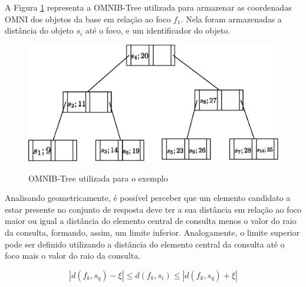 A Figura \ref{fig:btree} representa a OMNIB-Tree utilizada para armazenar as coordenadas OMNI dos objetos da base em relação ao foco $f_1$. Nela foram armazenadas
a distância do objeto $s_i$ até o foco, e um identificador do objeto.

\begin{figure}[H]
\centering
\caption{OMNIB-Tree utilizada para o exemplo}
\includegraphics[width=.8\textwidth]{dados/figuras/btree.eps}
\label{fig:btree}
\end{figure}

Analisando geometricamente, é possível perceber que um elemento candidato a estar presente no conjunto de resposta deve ter a sua distância em relação ao foco maior ou igual a distância do elemento central de consulta menos o valor do
raio da consulta, formando, assim, um limite inferior. Analogamente, o limite superior pode ser definido utilizando a distância do elemento central da consulta até o foco mais o valor do raio da consulta.

\begin{equation} \label{eq:omnirq}
|d(f_k, s_q) - \xi| \leq d(f_k, s_i) \leq |d(f_k, s_q) + \xi|
\end{equation}

